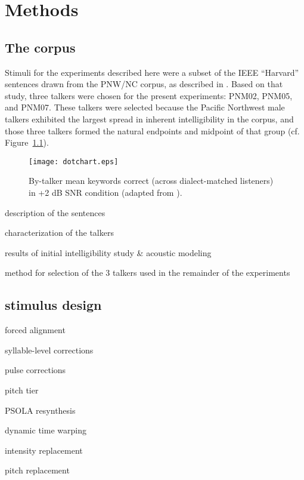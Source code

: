 \chapter{Methods}
\section{The corpus}
Stimuli for the experiments described here were a subset of the IEEE “Harvard” sentences \citep{HarvardSents} drawn from the PNW/NC corpus, as described in \citet{McCloyEtAl2013}.  Based on that study, three talkers were chosen for the present experiments: PNM02, PNM05, and PNM07.  These talkers were selected because the Pacific Northwest male talkers exhibited the largest spread in inherent intelligibility in the corpus, and those three talkers formed the natural endpoints and midpoint of that group (cf. Figure~\ref{fig:dotchart}).

\begin{figure}
	\begin{centering}
	\texttt{[image: dotchart.eps]}
	\caption{By-talker mean keywords correct (across dialect-matched listeners) in +2 dB SNR condition (adapted from \citet{McCloyEtAl2013}).\label{fig:dotchart}}
	\end{centering}
\end{figure}

\begin{itm}
	\item{description of the sentences}
	\item{characterization of the talkers}
	\item{results of initial intelligibility study \& acoustic modeling}
	\item{method for selection of the 3 talkers used in the remainder of the experiments}
\end{itm}


\section{stimulus design}
\begin{itm}
	\item{forced alignment}
	\item{syllable-level corrections}
	\item{pulse corrections}
	\item{pitch tier}
	\item{PSOLA resynthesis}
	\begin{itm}
		\item{dynamic time warping}
		\item{intensity replacement}
		\item{pitch replacement}
	\end{itm}	
\end{itm}


